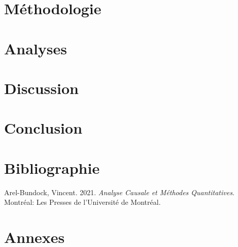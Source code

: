 \documentclass[
  12pt,
  letterpaper,
]{report}
\newlength{\cslhangindent}
\newenvironment{CSLReferences}[2] %
 {\begin{list}{}{%
  \setlength{\itemindent}{0pt}
  \setlength{\leftmargin}{0pt}
  \setlength{\parsep}{0pt}
  \ifodd #1
   \setlength{\leftmargin}{\cslhangindent}
   \setlength{\itemindent}{-1\cslhangindent}
  \fi
  \setlength{\itemsep}{#2\baselineskip}}}
 {\end{list}}
\begin{document}
\chapter{Méthodologie}\label{muxe9thodologie}


\chapter{Analyses}\label{analyses}


\chapter{Discussion}\label{discussion}


\chapter{Conclusion}\label{conclusion}


\chapter*{Bibliographie}\label{bibliographie}


\label{refs}
\begin{CSLReferences}{1}{0}
Arel-Bundock, Vincent. 2021. \emph{Analyse Causale et M{é}thodes
Quantitatives}. Montr{é}al: Les Presses de l'Universit{é} de Montr{é}al.

\end{CSLReferences}

\cleardoublepage
{}
{}
\appendix

\chapter{\texorpdfstring{{Annexes}}{Annexes}}\label{annexes-1}
\end{document}

